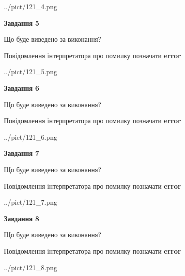 \documentclass[12pt, ukrainian]{article}
\begin{document}
{\begin{center}
	{../pict/121_4.png}
\end{center}
\newpage

{\begin {center}\textbf{Завдання 5}\end {center}}\par
Що буде виведено за виконання? \par
Повідомлення інтерпретатора про помилку позначати \textbf{error}

\begin{center}
	{../pict/121_5.png}
\end{center}
\newpage

{\begin {center}\textbf{Завдання 6}\end {center}}\par
Що буде виведено за виконання? \par
Повідомлення інтерпретатора про помилку позначати \textbf{error}

\begin{center}
	{../pict/121_6.png}
\end{center}
\newpage

{\begin {center}\textbf{Завдання 7}\end {center}}\par
Що буде виведено за виконання? \par
Повідомлення інтерпретатора про помилку позначати \textbf{error}

\begin{center}
	{../pict/121_7.png}
\end{center}
\newpage

{\begin {center}\textbf{Завдання 8}\end {center}}\par
Що буде виведено за виконання? \par
Повідомлення інтерпретатора про помилку позначати \textbf{error}

\begin{center}
	{../pict/121_8.png}
\end{center}
\newpage

}
\end{document}
